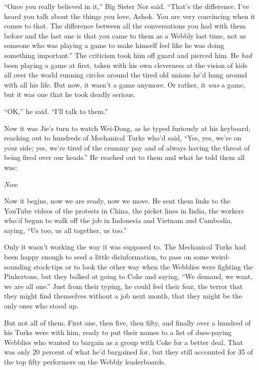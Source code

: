 ``Once you really believed in it,'' Big Sister Nor said. ``That's the
difference. I've heard you talk about the things you love, Ashok.
You are very convincing when it comes to that. The difference
between all the conversations you had with them before and the last
one is that you came to them as a Webbly last time, not as someone
who was playing a game to make himself feel like he was doing
something important.'' The criticism took him off guard and pierced
him. He \emph{had} been playing a game at first, taken with his own
cleverness at the vision of kids all over the world running circles
around the tired old unions he'd hung around with all his life. But
now, it wasn't a game anymore. Or rather, it \emph{was} a game, but
it was one that he took deadly serious.

``OK,'' he said. ``I'll talk to them.''

\tb

Now it was Jie's turn to watch Wei-Dong, as he typed furiously at
his keyboard, reaching out to hundreds of Mechanical Turks who'd
said, ``Yes, yes, we're on your side; yes, we're tired of the crummy
pay and of always having the threat of being fired over our heads.''
He reached out to them and what he told them all was:

\emph{Now}

Now it begins, now we are ready, now we move. He sent them links to
the YouTube videos of the protests in China, the picket lines in
India, the workers who'd begun to walk off the job in Indonesia and
Vietnam and Cambodia, saying, ``Us too, us all together, us too.''

Only it wasn't working the way it was supposed to. The Mechanical
Turks had been happy enough to seed a little disinformation, to
pass on some weird-sounding stock-tips or to look the other way
when the Webblies were fighting the Pinkertons, but they balked at
going to Coke and saying, ``We demand, we want, we are all one.''
Just from their typing, he could feel their fear, the terror that
they might find themselves without a job next month, that they
might be the only ones who stood up.

But not all of them. First one, then five, then fifty, and finally
over a hundred of his Turks were with him, ready to put their names
to a list of dues-paying Webblies who wanted to bargain as a group
with Coke for a better deal. That was only 20 percent of what he'd
bargained for, but they still accounted for 35 of the top fifty
performers on the Webbly leaderboards.

